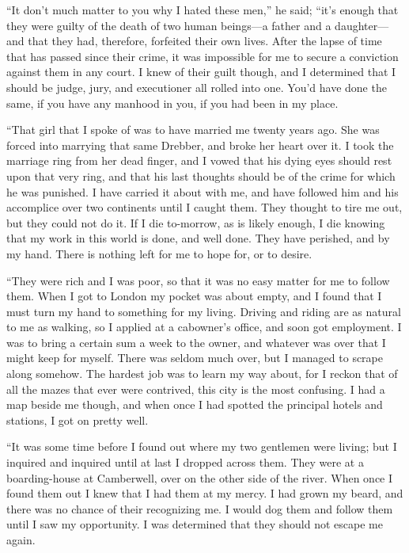\documentclass[12pt]{book}
\begin{document}
“It don’t much matter to you why I hated these men,” he said; “it’s enough that they were guilty of the death of two human beings—a father and a daughter—and that they had, therefore, forfeited their own lives. After the lapse of time that has passed since their crime, it was impossible for me to secure a conviction against them in any court. I knew of their guilt though, and I determined that I should be judge, jury, and executioner all rolled into one. You’d have done the same, if you have any manhood in you, if you had been in my place. 

“That girl that I spoke of was to have married me twenty years ago. She was forced into marrying that same Drebber, and broke her heart over it. I took the marriage ring from her dead finger, and I vowed that his dying eyes should rest upon that very ring, and that his last thoughts should be of the crime for which he was punished. I have carried it about with me, and have followed him and his accomplice over two continents until I caught them. They thought to tire me out, but they could not do it. If I die to-morrow, as is likely enough, I die knowing that my work in this world is done, and well done. They have perished, and by my hand. There is nothing left for me to hope for, or to desire. 

“They were rich and I was poor, so that it was no easy matter for me to follow them. When I got to London my pocket was about empty, and I found that I must turn my hand to something for my living. Driving and riding are as natural to me as walking, so I applied at a cabowner’s office, and soon got employment. I was to bring a certain sum a week to the owner, and whatever was over that I might keep for myself. There was seldom much over, but I managed to scrape along somehow. The hardest job was to learn my way about, for I reckon that of all the mazes that ever were contrived, this city is the most confusing. I had a map beside me though, and when once I had spotted the principal hotels and stations, I got on pretty well. 

“It was some time before I found out where my two gentlemen were living; but I inquired and inquired until at last I dropped across them. They were at a boarding-house at Camberwell, over on the other side of the river. When once I found them out I knew that I had them at my mercy. I had grown my beard, and there was no chance of their recognizing me. I would dog them and follow them until I saw my opportunity. I was determined that they should not escape me again. 
\end{document}
